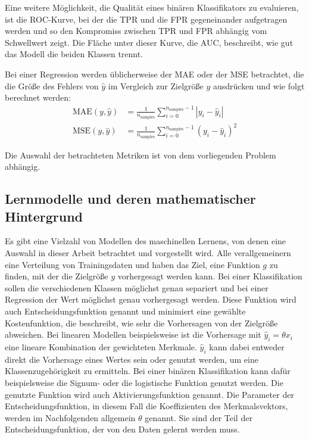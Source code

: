 	Eine weitere Möglichkeit, die Qualität eines binären Klassifikators zu evaluieren, ist die \ac{ROC}-Kurve, bei der die \ac{TPR} und die \ac{FPR} gegeneinander aufgetragen werden und so den Kompromiss zwischen \ac{TPR} und \ac{FPR} abhängig vom Schwellwert zeigt. Die Fläche unter dieser Kurve, die \ac{AUC}, beschreibt, wie gut das Modell die beiden Klassen trennt.
	
	Bei einer Regression werden üblicherweise der \ac{MAE} oder der \ac{MSE} betrachtet, die die Größe des Fehlers von $\hat{y}$ im Vergleich zur Zielgröße $y$ ausdrücken und wie folgt berechnet werden:
	\begin{align*}
		\text{MAE}(y, \hat{y}) &= \frac{1}{n_{\text{samples}}} \sum_{i=0}^{n_{\text{samples}}-1} \left| y_i - \hat{y}_i \right| \\
		\text{MSE}(y, \hat{y}) &= \frac{1}{n_\text{samples}} \sum_{i=0}^{n_\text{samples} - 1} (y_i - \hat{y}_i)^2		
	\end{align*}
	
	Die Auswahl der betrachteten Metriken ist von dem vorliegenden Problem abhängig.

	\subsection{Lernmodelle und deren mathematischer Hintergrund}
	
		Es gibt eine Vielzahl von Modellen des maschinellen Lernens, von denen eine Auswahl in dieser Arbeit betrachtet und vorgestellt wird. Alle verallgemeinern eine Verteilung von Trainingsdaten und haben das Ziel, eine Funktion $g$ zu finden, mit der die Zielgröße $y$ vorhergesagt werden kann. Bei einer Klassifikation sollen die verschiedenen Klassen möglichst genau separiert und bei einer Regression der Wert möglichst genau vorhergesagt werden. Diese Funktion wird auch Entscheidungsfunktion genannt und minimiert eine gewählte Kostenfunktion, die beschreibt, wie sehr die Vorhersagen von der Zielgröße abweichen. Bei linearen Modellen beispielsweise ist die Vorhersage mit $\hat{y}_i = \theta x_i$ eine lineare Kombination der gewichteten Merkmale. $\hat{y}_i$ kann dabei entweder direkt die Vorhersage eines Wertes sein oder genutzt werden, um eine Klassenzugehörigkeit zu ermitteln. Bei einer binären Klassifikation kann dafür beispielsweise die Signum- oder die logistische Funktion genutzt werden. Die genutzte Funktion wird auch Aktivierungsfunktion genannt. Die Parameter der Entscheidungsfunktion, in diesem Fall die Koeffizienten des Merkmalsvektors, werden im Nachfolgenden allgemein $\theta$ genannt. Sie sind der Teil der Entscheidungsfunktion, der von den Daten gelernt werden muss.
		
